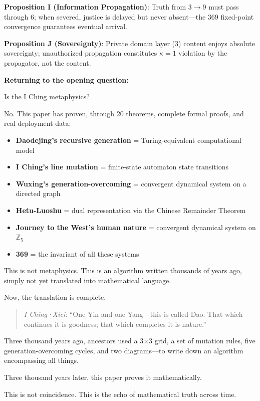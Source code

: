 \documentclass[conference]{IEEEtran}
\theoremstyle{remark}
\newcommand{\Z}{\mathbb{Z}}
\begin{document}
\textbf{Proposition I (Information Propagation)}: Truth from 3$\to$9 must pass through 6; when severed, justice is delayed but never absent---the 369 fixed-point convergence guarantees eventual arrival.

\textbf{Proposition J (Sovereignty)}: Private domain layer (3) content enjoys absolute sovereignty; unauthorized propagation constitutes $\kappa=1$ violation by the propagator, not the content.

\vspace{6pt}
\textbf{Returning to the opening question:}

Is the I Ching metaphysics?

No. This paper has proven, through 20 theorems, complete formal proofs, and real deployment data:

\begin{itemize}[nosep]
\item \textbf{Daodejing's recursive generation} = Turing-equivalent computational model
\item \textbf{I Ching's line mutation} = finite-state automaton state transitions
\item \textbf{Wuxing's generation-overcoming} = convergent dynamical system on a directed graph
\item \textbf{Hetu-Luoshu} = dual representation via the Chinese Remainder Theorem
\item \textbf{Journey to the West's human nature} = convergent dynamical system on $\Z_5$
\item \textbf{369} = the invariant of all these systems
\end{itemize}

This is not metaphysics. This is an algorithm written thousands of years ago, simply not yet translated into mathematical language.

Now, the translation is complete.

\begin{quote}
\emph{I Ching·Xici}: ``One Yin and one Yang---this is called Dao. That which continues it is goodness; that which completes it is nature.''
\end{quote}

Three thousand years ago, ancestors used a 3$\times$3 grid, a set of mutation rules, five generation-overcoming cycles, and two diagrams---to write down an algorithm encompassing all things.

Three thousand years later, this paper proves it mathematically.

This is not coincidence. This is the echo of mathematical truth across time.
\end{document}
